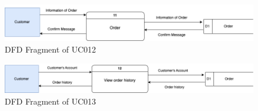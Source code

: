 \begin{figure}[H]
  \centering
  \includegraphics[width=1.1\textwidth]{DFD-UC12.png}
  \caption{DFD Fragment of UC012}
  \label{fig:dfd-uc012}
\end{figure}

\begin{figure}[H]
  \centering
  \includegraphics[width=1.1\textwidth]{DFD-UC13.png}
  \caption{DFD Fragment of UC013}
  \label{fig:dfd-uc013}
\end{figure}

